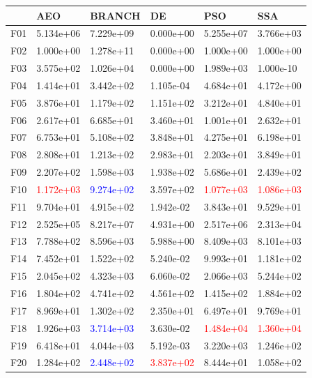 \documentclass{article}
\begin{document}
\begin{table}[H]
	\centering
	\begin{tabular}{|l|lllll|}
		\hline
		{} &        AEO &     BRANCH &         DE &        PSO &        SSA \\
		\hline
		F01  &  5.134e+06 &  7.229e+09 &  0.000e+00 &  5.255e+07 &  3.766e+03 \\
		F02  &  1.000e+00 &  1.278e+11 	 &  0.000e+00 &  1.000e+00 &  1.000e+00 \\
		F03  &  3.575e+02 &  1.026e+04 &  0.000e+00 &  1.989e+03 &  1.000e-10 \\
		F04  &  1.414e+01 &  3.442e+02 &  1.105e-04 &  4.684e+01 &  4.172e+00 \\
		F05  &  3.876e+01 &  1.179e+02 &  1.151e+02 &  3.212e+01 &  4.840e+01 \\
		F06  &  2.617e+01 &  6.685e+01 &  3.460e+01 &  1.001e+01 &  2.632e+01 \\
		F07  &  6.753e+01 &  5.108e+02 &  3.848e+01 &  4.275e+01 &  6.198e+01 \\
		F08  &  2.808e+01 &  1.213e+02 &  2.983e+01 &  2.203e+01 &  3.849e+01 \\
		F09  &  2.207e+02 &  1.598e+03 	 &  1.938e+02 &  5.686e+01 &  2.439e+02 \\
		F10  &  \textcolor{red}{1.172e+03} &  \textcolor{blue}{9.274e+02} &  3.597e+02 &  \textcolor{red}{1.077e+03} &  \textcolor{red}{1.086e+03} \\
		F11  &  9.704e+01 &  4.915e+02 &  1.942e-02 &  3.843e+01 &  9.529e+01 \\
		F12  &  2.525e+05 &  8.217e+07 &  4.931e+00 &  2.517e+06 &  2.313e+04 \\
		F13  &  7.788e+02 &  8.596e+03 &  5.988e+00 &  8.409e+03 &  8.101e+03 \\
		F14  &  7.452e+01 &  1.522e+02 &  5.240e-02 &  9.993e+01 &  1.181e+02 \\
		F15  &  2.045e+02 &  4.323e+03 	 &  6.060e-02 &  2.066e+03 &  5.244e+02 \\
		F16  &  1.804e+02 &  4.741e+02 &  4.561e+02 &  1.415e+02 &  1.884e+02 \\
		F17  &  8.969e+01 &  1.302e+02 &  2.350e+01 &  6.497e+01 &  9.769e+01 \\
		F18  &  1.926e+03 &  \textcolor{blue}{3.714e+03} &  3.630e-02 &  \textcolor{red}{1.484e+04} &  \textcolor{red}{1.360e+04} \\
		F19  &  6.418e+01 &  4.044e+03 	 &  5.192e-03 &  3.220e+03 &  1.246e+02 \\
		F20  &  1.284e+02 &  \textcolor{blue}{2.448e+02} &  \textcolor{red}{3.837e+02} &  8.444e+01 &  1.058e+02 \\

\end{tabular}
\end{table}
\end{document}
